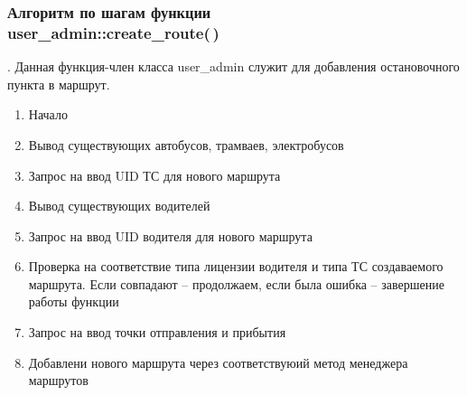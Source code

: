 \subsubsection{Алгоритм по шагам функции \\user\_admin::create\_route(\,)\,}.
Данная функция-член класса user\_admin служит для добавления остановочного пункта в маршрут.
\begin{enumerate}
    \item Начало
    \item Вывод существующих автобусов, трамваев, электробусов
    \item Запрос на ввод UID ТС для нового маршрута
    \item Вывод существующих водителей
    \item Запрос на ввод UID водителя для нового маршрута
    \item Проверка на соответствие типа лицензии водителя и типа ТС создаваемого маршрута. Если совпадают -- продолжаем, если была ошибка -- завершение работы функции
    \item Запрос на ввод точки отправления и прибытия
    \item Добавлени нового маршрута через соответствуюий метод менеджера маршрутов
\end{enumerate}